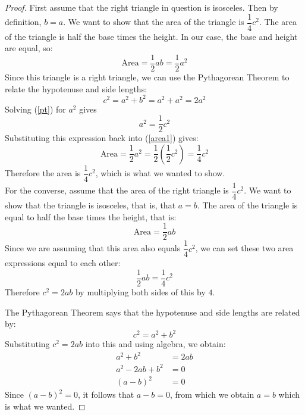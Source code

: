 \documentclass[11pt]{article}
\begin{document}
\begin{enumerate}
\begin{proof}
	First assume that the right triangle in question is isosceles. Then by definition, $b = a$. We want to show that the area of the triangle is $\dfrac{1}{4}c^2$. The area of the triangle is half the base times the height. In our case, the base and height are equal, so: 
	\begin{equation}\label{area1}
		\text{Area} = \frac{1}{2}ab = \frac{1}{2}a^2
	\end{equation}
Since this triangle is a right triangle, we can use the Pythagorean Theorem to relate the hypotenuse and side lengths: 
\begin{equation}\label{pt}
	c^2 = a^2 + b^2 = a^2 + a^2 = 2a^2
\end{equation}
Solving (\ref{pt}) for $a^2$ gives 
\[ a^2 = \frac{1}{2}c^2 \]
Substituting this expression back into (\ref{area1}) gives: 
\[ \text{Area} = \frac{1}{2}a^2 = \frac{1}{2}\left(\frac{1}{2}c^2 \right) = \frac{1}{4}c^2 \]
Therefore the area is $\dfrac{1}{4}c^2$, which is what we wanted to show. \\

For the converse, assume that the area of the right triangle is $\dfrac{1}{4}c^2$. We want to show that the triangle is isosceles, that is, that $a=b$. The area of the triangle is equal to half the base times the height, that is: 
\begin{equation}\label{area2}
	\text{Area} = \frac{1}{2}ab
\end{equation}
Since we are assuming that this area also equals $\dfrac{1}{4}c^2$, we can set these two area expressions equal to each other: 
\begin{equation*}\label{area3}
	\frac{1}{2}ab = \frac{1}{4}c^2 
\end{equation*}
Therefore $c^2 = 2ab$ by multiplying both sides of this by $4$. 

The Pythagorean Theorem says that the hypotenuse and side lengths are related by: 
\[ c^2 = a^2 + b^2 \]
Substituting $c^2 = 2ab$ into this and using algebra, we obtain: 
\begin{align*}
	a^2 + b^2 &= 2ab \\
	a^2 - 2ab + b^2 &= 0 \\
	(a - b)^2 &= 0
\end{align*}
Since $(a-b)^2 = 0$, it follows that $a-b= 0$, from which we obtain $a=b$ which is what we wanted. 
\end{proof}
	
\end{enumerate}	
\end{document}

